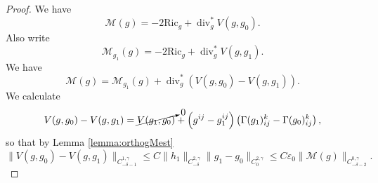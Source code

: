\documentclass[12pt]{amsart}
\newcommand{\calM}{\mathcal{M}}
\renewcommand{\1}{{\mathbf 1}}
\newcommand{\Ric}{\mathrm{Ric}}
\renewcommand{\div}{{\operatorname{div} }}
\newcommand{\eps}{{\varepsilon}}
\theoremstyle{others}
\numberwithin{equation}{section}
\begin{document}
\begin{proof}
We have
$$\calM(g) = -2 \Ric_g + \div_g^* V(g, g_0).$$
Also write
$$\calM_{g_1}(g) = -2 \Ric_g + \div_g^* V(g, g_1).$$
We have
\begin{equation}\label{M(g)M(g1)}
\calM(g) = \calM_{g_1}(g) + \div_g^* \left( V(g,g_0) - V(g,g_1) \right).
\end{equation}
We calculate
$$V(g,g_0) - V(g,g_1) = \cancelto{0}{V(g_1,g_0)} + \left( g^{ij} - g_1^{ij} \right) \left( \Gamma(g_1)^k_{ij} - \Gamma(g_0)^k_{ij} \right),$$
so that by Lemma \ref{lemma:orthogMest}
\begin{equation*}%
\| V(g,g_0) - V(g,g_1) \|_{C^{1,\gamma}_{-\delta - 1}} \leq C \| h_1 \|_{C^{2,\gamma}_{-\delta}} \| g_1 - g_0 \|_{C^{2, \gamma}_{0}} \leq C \eps_0 \| \calM(g) \|_{C^{0,\gamma}_{-\delta - 2}}.
\end{equation*}




\end{proof}
\end{document}
